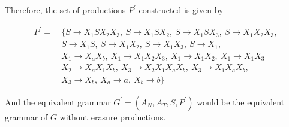 Therefore, the set of productions $P^\prime$ constructed is given by

\begin{equation}
\begin{aligned}
P^\prime =\ & \{S\rightarrow X_1SX_2X_3,\ S\rightarrow X_1SX_2,\ S\rightarrow X_1SX_3,\ S\rightarrow X_1X_2X_3,\\
& S\rightarrow X_1S,\ S\rightarrow X_1X_2,\ S\rightarrow X_1X_3,\ S\rightarrow X_1,\\
& X_1 \rightarrow X_aX_b,\ X_1\rightarrow X_1X_2X_3,\ X_1 \rightarrow X_1X_2,\ X_1 \rightarrow X_1X_3\\
& X_2 \rightarrow X_aX_1X_b,\ X_3\rightarrow X_2X_1X_aX_b,\ X_3\rightarrow X_1X_aX_b,\\
& X_3 \rightarrow X_b,\ X_a\rightarrow a,\ X_b \rightarrow b\}
\end{aligned}
\end{equation}

And the equivalent grammar $G^\prime=(A_N, A_T, S, P^\prime)$ would be the equivalent grammar of $G$ without erasure productions.
